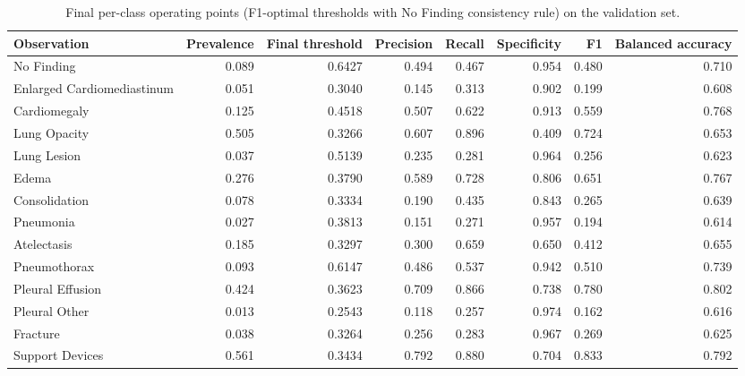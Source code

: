 \begin{table}[t]
\centering
\small
\begin{tabular}{lrrrrrrr}
\hline
Observation & Prevalence & Final threshold & Precision & Recall & Specificity & F1 & Balanced accuracy \\
\hline
No Finding & 0.089 & 0.6427 & 0.494 & 0.467 & 0.954 & 0.480 & 0.710 \\
Enlarged Cardiomediastinum & 0.051 & 0.3040 & 0.145 & 0.313 & 0.902 & 0.199 & 0.608 \\
Cardiomegaly & 0.125 & 0.4518 & 0.507 & 0.622 & 0.913 & 0.559 & 0.768 \\
Lung Opacity & 0.505 & 0.3266 & 0.607 & 0.896 & 0.409 & 0.724 & 0.653 \\
Lung Lesion & 0.037 & 0.5139 & 0.235 & 0.281 & 0.964 & 0.256 & 0.623 \\
Edema & 0.276 & 0.3790 & 0.589 & 0.728 & 0.806 & 0.651 & 0.767 \\
Consolidation & 0.078 & 0.3334 & 0.190 & 0.435 & 0.843 & 0.265 & 0.639 \\
Pneumonia & 0.027 & 0.3813 & 0.151 & 0.271 & 0.957 & 0.194 & 0.614 \\
Atelectasis & 0.185 & 0.3297 & 0.300 & 0.659 & 0.650 & 0.412 & 0.655 \\
Pneumothorax & 0.093 & 0.6147 & 0.486 & 0.537 & 0.942 & 0.510 & 0.739 \\
Pleural Effusion & 0.424 & 0.3623 & 0.709 & 0.866 & 0.738 & 0.780 & 0.802 \\
Pleural Other & 0.013 & 0.2543 & 0.118 & 0.257 & 0.974 & 0.162 & 0.616 \\
Fracture & 0.038 & 0.3264 & 0.256 & 0.283 & 0.967 & 0.269 & 0.625 \\
Support Devices & 0.561 & 0.3434 & 0.792 & 0.880 & 0.704 & 0.833 & 0.792 \\
\hline
\end{tabular}
\caption{Final per-class operating points (F1-optimal thresholds with No Finding consistency rule) on the validation set.}
\label{tab:table2_final_per_class_operating_points}
\end{table}
